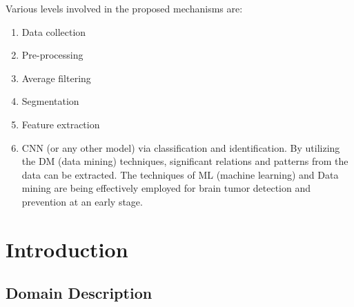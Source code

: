 \documentclass[10pt]{report}
\begin{document}
	Various levels involved in the proposed mechanisms are:

	\begin{enumerate}
		\item Data collection
		\item Pre-processing
		\item Average filtering
		\item Segmentation
		\item Feature extraction
		\item CNN (or any other model) via classification and identification. By
			utilizing the DM (data mining) techniques, significant relations and
			patterns from the data can be extracted. The techniques of ML
			(machine learning) and Data mining are being effectively employed
			for brain tumor detection and prevention at an early stage.
	\end{enumerate}

	\chapter{Introduction}
	\section[domain description]{Domain Description}
\end{document}
